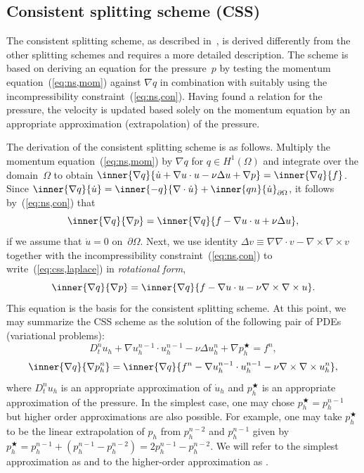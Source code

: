 \subsection{Consistent splitting scheme (CSS)}
\label{sec:css}

The consistent splitting scheme, as described in~\cite{GuermondMinevShen2006,gueshe},
is derived differently from the other splitting schemes and requires a
more detailed description. The scheme is based on deriving an equation
for the pressure~$p$ by testing the momentum
equation~(\ref{eq:ns,mom}) against $\nabla q$ in combination with
suitably using the incompressibility constraint~(\ref{eq:ns,con}).
Having found a relation for the pressure, the velocity is updated
based solely on the momentum equation by an appropriate approximation
(extrapolation) of the pressure.

The derivation of the consistent splitting scheme is as follows.
Multiply the momentum equation~(\ref{eq:ns,mom}) by $\nabla q$ for $q
\in H^1(\Omega)$ and integrate over the domain~$\Omega$ to obtain
$\inner{\nabla q}{\dot{u} + \nabla u \cdot u - \nu \Delta u + \nabla
  p} = \inner{\nabla q}{f}$. Since $\inner{\nabla q}{\dot{u}} =
\inner{-q}{\nabla \cdot \dot{u}} + \inner{qn}{\dot{u}}_{\partial
  \Omega}$, it follows by~(\ref{eq:ns,con}) that
\begin{equation}\label{eq:css,laplace}
  \inner{\nabla q}{\nabla p} = \inner{\nabla q}{f - \nabla u \cdot u +
    \nu \Delta u},
\end{equation}
if we assume that $\dot{u} = 0$ on~$\partial\Omega$. Next, we use
identity $\Delta v \equiv \nabla \nabla \cdot v - \nabla \times \nabla
\times v$ together with the incompressibility
constraint~(\ref{eq:ns,con}) to write~(\ref{eq:css,laplace}) in
\emph{rotational form},
\begin{equation}\label{eq:css,curl}
  \inner{\nabla q}{\nabla p} = \inner{\nabla q}{f - \nabla u \cdot u -
    \nu \nabla \times \nabla \times u}.
\end{equation}
This equation is the basis for the consistent splitting scheme. At
this point, we may summarize the CSS scheme as the solution of the
following pair of PDEs (variational problems):
\begin{equation} \label{eq:css,u}
  D_t^n u_h
  + \nabla u_h^{n-1} \cdot u_h^{n-1}
  - \nu \Delta u_h^n
  + \nabla p_h^{\bigstar}
  = f^n,
\end{equation}
\begin{equation} \label{eq:css,pn}
  \inner{\nabla q}{\nabla p_h^n} =
  \inner{\nabla q}{f^n -\nabla u_h^{n-1} \cdot u_h^{n-1} - \nu \nabla \times \nabla \times u_h^n},
\end{equation}
where $D_t^n u_h$ is an appropriate approximation of $\dot{u}_h$ and
$p^{\bigstar}_h$ is an appropriate approximation of the pressure. In
the simplest case, one may chose $p_h^{\bigstar} = p_h^{n-1}$ but
higher order approximations are also possible. For example, one may
take $p_h^{\bigstar}$ to be the linear extrapolation of $p_h$ from
$p_h^{n-2}$ and $p_h^{n-1}$ given by $p_h^{\bigstar} = p_h^{n-1} +
(p_h^{n-1} - p_h^{n-2}) = 2p_h^{n-1} - p_h^{n-2}$. We will refer to
the simplest approximation as  and to the higher-order
approximation as .

